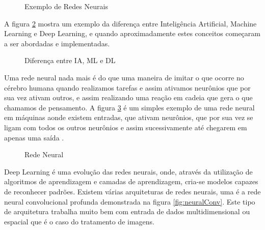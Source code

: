 %
\begin{figure}[H]
	\centering
	\caption{Exemplo de Redes Neurais}
	\def\svgwidth{14cm}
	
	\label{fig:exRedeNeural}
\end{figure}

A figura \ref{fig:iamldl} mostra um exemplo da diferença entre Inteligência Artificial, Machine Learning e Deep Learning, e quando aproximadamente estes conceitos começaram a ser abordadas e implementadas.

%
\begin{figure}[H]
	\centering
	\caption{Diferença entre IA, ML e DL}
	\def\svgwidth{15cm}
	
	\label{fig:iamldl}
\end{figure}

Uma rede neural nada mais é do que uma maneira de imitar o que ocorre no cérebro humana quando realizamos tarefas e assim ativamos neurônios que por sua vez ativam outros, e assim realizando uma reação em cadeia que gera o que chamamos de pensamento. A figura \ref{fig:neural} é um simples exemplo de uma rede neural em máquinas aonde existem entradas, que ativam neurônios, que por sua vez se ligam com todos os outros neurônios e assim sucessivamente até chegarem em apenas uma saída \cite{vinte}.

\begin{figure}[H]
	\centering
	\caption{Rede Neural}
	\def\svgwidth{15cm}
	
	\label{fig:neural}
\end{figure}

Deep Learning é uma evolução das redes neurais, onde, através da utilização de algoritmos de aprendizagem e camadas de aprendizagem, cria-se modelos capazes de reconhecer padrões.
Existem várias arquiteturas de redes neurais, uma é a rede neural convolucional profunda demonstrada na figura \ref{fig:neuralConv}. Este tipo de arquitetura trabalha muito bem com entrada de dados multidimensional ou espacial que é o caso do tratamento de imagens. 

